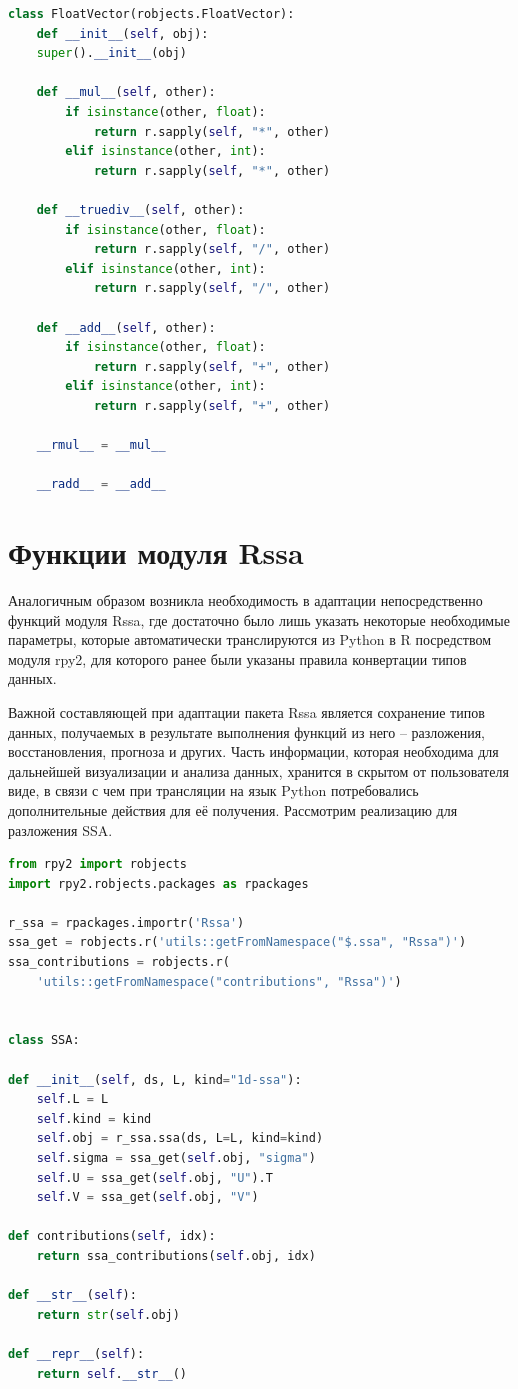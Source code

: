 \documentclass[specialist,
			   substylefile = spbu_report.rtx,
			   subf,href,colorlinks=true, 12pt]{disser}
\begin{document}
\begin{lstlisting}[language=Python, caption=Наследование для FloatVector.]
class FloatVector(robjects.FloatVector):
	def __init__(self, obj):
	super().__init__(obj)
	
	def __mul__(self, other):
		if isinstance(other, float):
			return r.sapply(self, "*", other)
		elif isinstance(other, int):
			return r.sapply(self, "*", other)
	
	def __truediv__(self, other):
		if isinstance(other, float):
			return r.sapply(self, "/", other)
		elif isinstance(other, int):
			return r.sapply(self, "/", other)
	
	def __add__(self, other):
		if isinstance(other, float):
			return r.sapply(self, "+", other)
		elif isinstance(other, int):
			return r.sapply(self, "+", other)
	
	__rmul__ = __mul__
	
	__radd__ = __add__	
\end{lstlisting}

\section{Функции модуля Rssa}

Аналогичным образом возникла необходимость в адаптации непосредственно функций модуля Rssa, где достаточно было лишь указать некоторые необходимые параметры, которые автоматически транслируются из Python в R посредством модуля rpy2, для которого ранее были указаны правила конвертации типов данных. 

Важной составляющей при адаптации пакета Rssa является сохранение типов данных, получаемых в результате выполнения функций из него – разложения, восстановления, прогноза и других. Часть информации, которая необходима для дальнейшей визуализации и анализа данных, хранится в скрытом от пользователя виде, в связи с чем при трансляции на язык Python потребовались дополнительные действия для её получения. Рассмотрим реализацию для разложения SSA.

\begin{lstlisting}[language=Python, caption=Реализация типа данных SSA в Python.]
from rpy2 import robjects
import rpy2.robjects.packages as rpackages

r_ssa = rpackages.importr('Rssa')
ssa_get = robjects.r('utils::getFromNamespace("$.ssa", "Rssa")')
ssa_contributions = robjects.r(
	'utils::getFromNamespace("contributions", "Rssa")')


class SSA:

def __init__(self, ds, L, kind="1d-ssa"):
	self.L = L
	self.kind = kind
	self.obj = r_ssa.ssa(ds, L=L, kind=kind)
	self.sigma = ssa_get(self.obj, "sigma")
	self.U = ssa_get(self.obj, "U").T
	self.V = ssa_get(self.obj, "V")

def contributions(self, idx):
	return ssa_contributions(self.obj, idx)

def __str__(self):
	return str(self.obj)

def __repr__(self):
	return self.__str__()
\end{lstlisting}
\end{document}
